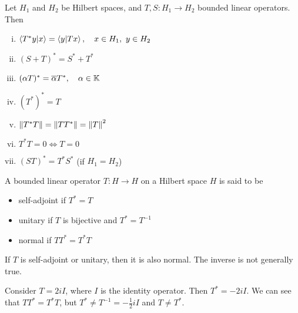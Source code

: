 \documentclass[../../script.tex]{subfiles}
\begin{document}
    \begin{thm}
        Let $H_1$ and $H_2$ be Hilbert spaces, and $T, S: H_1 \rightarrow H_2$ bounded linear operators. Then 
        \begin{enumerate}[(i)]
            \item $\innerproduct{T^* y}{x} = \innerproduct{y}{Tx}, \quad x \in H_1, ~y \in H_2$
            \item $(S + T)^* = S^* + T^*$
            \item $(\alpha T)^* = \overline{\alpha} T^*, \quad \alpha \in \mathbb{K}$
            \item $(T^*)^* = T$
            \item $\norm{T^* T} = \norm{TT^*} = \norm{T}^2$
            \item $T^* T = 0 \iff T = 0$
            \item $(ST)^* = T^* S^*$ (if $H_1 = H_2$)
        \end{enumerate}
    \end{thm}

    \begin{defi}
        A bounded linear operator $T: H \rightarrow H$ on a Hilbert space $H$ is said to be 
        \begin{itemize}
            \item self-adjoint if $T^* = T$
            \item unitary if $T$ is bijective and $T^* = T^{-1}$
            \item normal if $TT^* = T^*T$
        \end{itemize}
        If $T$ is self-adjoint or unitary, then it is also normal. The inverse is not generally true.
    \end{defi}

    \begin{eg}
        Consider $T = 2i I$, where $I$ is the identity operator. Then $T^* = -2i I$. We can see that $TT^* = T^*T$, but $T^* \ne T^{-1} = -\frac{1}{2} i I$ and $T \ne T^*$.
    \end{eg}
\end{document}
